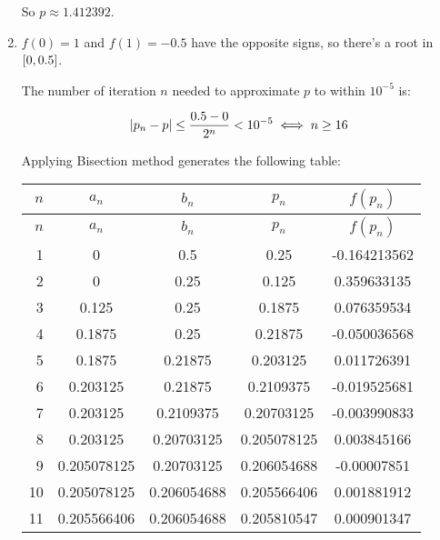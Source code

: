\documentclass[../../../../Assignments.tex]{subfiles}
\begin{document}
\begin{solution}
\begin{enumerate}[label = (\alph*)]
            So \(p \approx \num{1.412392}\).

        \item \(f(0) = 1\) and \(f(1) = \num{-0.5}\) have the opposite signs, so
            there's a root in \(\interval{0}{\num{0.5}}\).

            The number of iteration \(n\) needed to approximate \(p\) to within
            \(10^{-5}\) is:

            \[\abs{p_n - p} \leq \frac{\num{0.5} - 0}{2^n} < 10^{-5} \iff n \geq 16\]

            Applying Bisection method generates the following table:

            \begin{longtable}{r S[table-format=1.9] S[table-format=1.9] S[table-format=1.9] S[table-format=-1.9]}
                \toprule
                \(n\)  &   {\(a_n\)}   &   {\(b_n\)}   &   {\(p_n\)}   &  {\(f(p_n)\)}  \\
                \midrule
                \endfirsthead
                \(n\)  &   {\(a_n\)}   &   {\(b_n\)}   &   {\(p_n\)}   &  {\(f(p_n)\)}  \\
                \midrule
                  &  0            &  0.5          &  0.25         &  -0.164213562  \\
                    2  &  0            &  0.25         &  0.125        &   0.359633135  \\
                    3  &  0.125        &  0.25         &  0.1875       &   0.076359534  \\
                    4  &  0.1875       &  0.25         &  0.21875      &  -0.050036568  \\
                    5  &  0.1875       &  0.21875      &  0.203125     &   0.011726391  \\
                    6  &  0.203125     &  0.21875      &  0.2109375    &  -0.019525681  \\
                    7  &  0.203125     &  0.2109375    &  0.20703125   &  -0.003990833  \\
                    8  &  0.203125     &  0.20703125   &  0.205078125  &   0.003845166  \\
                    9  &  0.205078125  &  0.20703125   &  0.206054688  &  -0.00007851   \\
                    10  &  0.205078125  &  0.206054688  &  0.205566406  &   0.001881912  \\
                    11  &  0.205566406  &  0.206054688  &  0.205810547  &   0.000901347  \\

\end{longtable}
\end{enumerate}
\end{solution}
\end{document}
